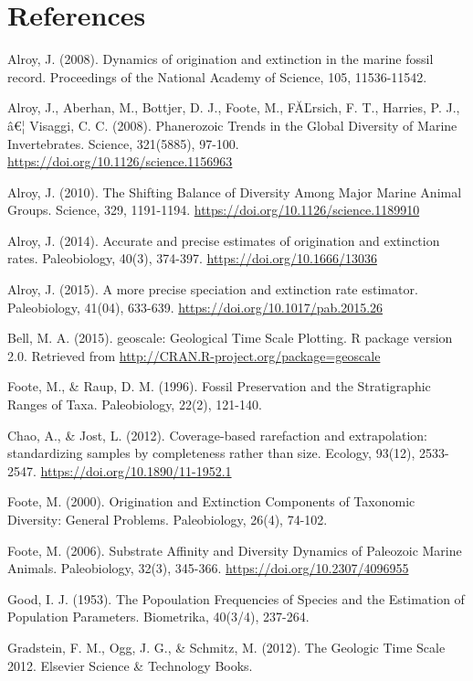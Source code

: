 \documentclass[]{article}
\newcommand{\euro}{€}
\begin{document}
\section{References}\label{references}

Alroy, J. (2008). Dynamics of origination and extinction in the marine
fossil record. Proceedings of the National Academy of Science, 105,
11536-11542.

Alroy, J., Aberhan, M., Bottjer, D. J., Foote, M., FĂĽrsich, F. T.,
Harries, P. J., â\euro{}¦ Visaggi, C. C. (2008). Phanerozoic Trends in
the Global Diversity of Marine Invertebrates. Science, 321(5885),
97-100. \url{https://doi.org/10.1126/science.1156963}

Alroy, J. (2010). The Shifting Balance of Diversity Among Major Marine
Animal Groups. Science, 329, 1191-1194.
\url{https://doi.org/10.1126/science.1189910}

Alroy, J. (2014). Accurate and precise estimates of origination and
extinction rates. Paleobiology, 40(3), 374-397.
\url{https://doi.org/10.1666/13036}

Alroy, J. (2015). A more precise speciation and extinction rate
estimator. Paleobiology, 41(04), 633-639.
\url{https://doi.org/10.1017/pab.2015.26}

Bell, M. A. (2015). geoscale: Geological Time Scale Plotting. R package
version 2.0. Retrieved from
\url{http://CRAN.R-project.org/package=geoscale}

Foote, M., \& Raup, D. M. (1996). Fossil Preservation and the
Stratigraphic Ranges of Taxa. Paleobiology, 22(2), 121-140.

Chao, A., \& Jost, L. (2012). Coverage-based rarefaction and
extrapolation: standardizing samples by completeness rather than size.
Ecology, 93(12), 2533-2547. \url{https://doi.org/10.1890/11-1952.1}

Foote, M. (2000). Origination and Extinction Components of Taxonomic
Diversity: General Problems. Paleobiology, 26(4), 74-102.

Foote, M. (2006). Substrate Affinity and Diversity Dynamics of Paleozoic
Marine Animals. Paleobiology, 32(3), 345-366.
\url{https://doi.org/10.2307/4096955}

Good, I. J. (1953). The Popoulation Frequencies of Species and the
Estimation of Population Parameters. Biometrika, 40(3/4), 237-264.

Gradstein, F. M., Ogg, J. G., \& Schmitz, M. (2012). The Geologic Time
Scale 2012. Elsevier Science \& Technology Books.
\end{document}
